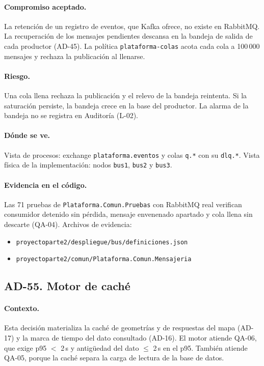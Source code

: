 \paragraph{Compromiso aceptado.} La retención de un registro de eventos, que Kafka ofrece, no existe en RabbitMQ.
La recuperación de los mensajes pendientes descansa en la bandeja de salida de cada productor (AD-45).
La política \texttt{plataforma-colas} acota cada cola a 100\,000 mensajes y rechaza la publicación al llenarse.

\paragraph{Riesgo.} Una cola llena rechaza la publicación y el relevo de la bandeja reintenta.
Si la saturación persiste, la bandeja crece en la base del productor.
La alarma de la bandeja no se registra en Auditoría (L-02).

\paragraph{Dónde se ve.} Vista de procesos: exchange \texttt{plataforma.eventos} y colas \texttt{q.*} con su \texttt{dlq.*}.
Vista física de la implementación: nodos \texttt{bus1}, \texttt{bus2} y \texttt{bus3}.

\paragraph{Evidencia en el código.} Las 71 pruebas de \texttt{Plataforma.Comun.Pruebas} con RabbitMQ real verifican consumidor detenido sin pérdida, mensaje envenenado apartado y cola llena sin descarte (QA-04).
Archivos de evidencia:
{\raggedright
\begin{itemize}
  \item \texttt{proyectoparte2/\br{}despliegue/\br{}bus/\br{}definiciones.json}
  \item \texttt{proyectoparte2/\br{}comun/\br{}Plataforma.Comun.Mensajeria}
\end{itemize}
\par}

\subsection{AD-55. Motor de caché}
\label{sec:tec-ad55}

\paragraph{Contexto.} Esta decisión materializa la caché de geometrías y de respuestas del mapa (AD-17) y la marca de tiempo del dato consultado (AD-16).
El motor atiende QA-06, que exige p95 $<$ 2\,s y antigüedad del dato $\le$ 2\,s en el p95.
También atiende QA-05, porque la caché separa la carga de lectura de la base de datos.

